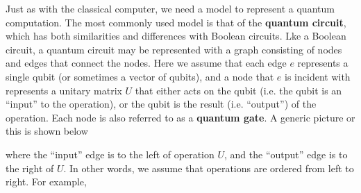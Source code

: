 \documentclass [12pt]{article}
\theoremstyle{definition}
\begin{document}
Just as with the classical computer, we need a model to represent a quantum computation. The most commonly used model is that of the \textbf{quantum circuit}, which 
has both similarities and differences with Boolean circuits. Lke a Boolean circuit, a quantum circuit may be represented with a graph consisting of nodes and edges
that connect the nodes. Here we assume that each edge $e$ represents a single qubit (or sometimes a vector of qubits), and a node that $e$ is incident with represents 
a unitary matrix $U$ that either acts on the qubit (i.e. the qubit is an ``input'' to the operation), or the qubit is the result (i.e. ``output'') of the operation.
Each node is also referred to as a \textbf{quantum gate}.
A generic picture or this is shown below

\begin{center}
\end{center}

where the ``input'' edge is to the left of operation $U$, and the ``output'' edge is to the right of $U$. In other words, we assume that operations are ordered from left
to right. For example,

\begin{center}
\end{center}
\end{document}
